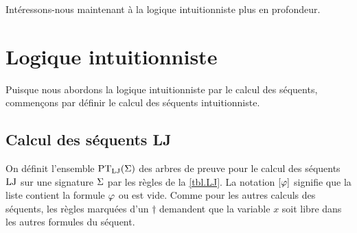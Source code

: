 \noindent
Intéressons-nous maintenant à la logique intuitionniste plus en profondeur.

\section{Logique intuitionniste}\label{sec.LJ}

Puisque nous abordons la logique intuitionniste par le calcul des séquents,
commençons par définir le calcul des séquents intuitionniste.

\subsection{Calcul des séquents LJ}

\begin{definition}
  On définit l'ensemble $\operatorname{PT}_{\operatorname{LJ}}(\Sigma)$ des arbres de preuve pour le calcul
  des séquents $\operatorname{LJ}$ sur une signature $\Sigma$ par les règles de la
  \cref{tbl.LJ}. La notation $[\varphi]$ signifie que la liste contient la
  formule $\varphi$ ou est vide. Comme pour les autres calculs des séquents,
  les règles marquées d'un $\dagger$ demandent que la variable $x$ soit libre
  dans les autres formules du séquent.
\end{definition}

